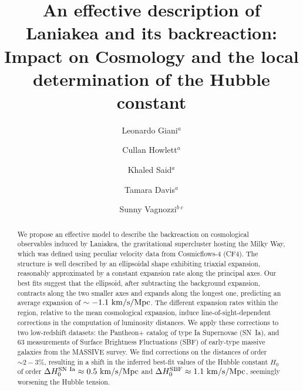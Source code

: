 \documentclass[notitlepage,nofootinbib]{revtex4-1}
\begin{document}
\title{An effective description of Laniakea and its backreaction: Impact on Cosmology and the local determination of the Hubble constant}

\author{Leonardo Giani$^a$}

 \author{Cullan Howlett$^a$}


 \author{Khaled Said$^a$}

 \author{Tamara Davis$^a$}


 \author{Sunny Vagnozzi$^{b\;c}$}


\begin{abstract}
\noindent We propose an effective model to describe the backreaction on cosmological observables induced by Laniakea, the gravitational supercluster hosting the Milky Way, which was defined using peculiar velocity data from Cosmicflows-4 (CF4). The structure is well described by an ellipsoidal shape exhibiting triaxial expansion, reasonably approximated by a constant expansion rate along the principal axes. Our best fits suggest that the ellipsoid, after subtracting the background expansion, contracts along the two smaller axes and expands along the longest one, predicting an average expansion of $\sim -1.1 ~\rm{km}/\rm{s}/\rm{Mpc}$. The different expansion rates within the region, relative to the mean cosmological expansion, induce line-of-sight-dependent corrections in the computation of luminosity distances. We apply these corrections to two low-redshift datasets: the Pantheon+ catalog of type Ia Supernovae (SN~Ia), and 63 measurements of Surface Brightness Fluctuations (SBF) of early-type massive galaxies from the MASSIVE survey. We find corrections on 
 the distances of order $\sim 2-3\%$, resulting in a shift in the inferred best-fit values of the Hubble constant $H_0$ of order $\Delta H_0^{\rm{SN~Ia}}\approx 0.5 ~\rm{km}/\rm{s}/\rm{Mpc}$ and $\Delta H_0^{\rm{SBF}}\approx 1.1 ~\rm{km}/\rm{s}/\rm{Mpc}$, seemingly worsening the Hubble tension.        
\end{abstract}
\end{document}
